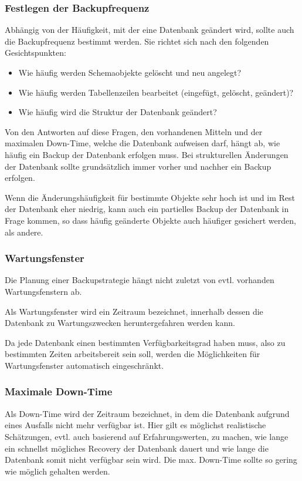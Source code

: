         \subsubsection{Festlegen der Backupfrequenz}
          Abh\"angig von der H\"aufigkeit, mit der eine Datenbank ge\"andert wird, sollte auch die Backupfrequenz bestimmt werden. Sie richtet sich nach den folgenden Gesichtspunkten:
          \begin{itemize}
            \item Wie h\"aufig werden Schemaobjekte gel\"oscht und neu angelegt?
            \item Wie h\"aufig werden Tabellenzeilen bearbeitet (eingef\"ugt, gel\"oscht, ge\"andert)?
            \item Wie h\"aufig wird die Struktur der Datenbank ge\"andert?
          \end{itemize}
          Von den Antworten auf diese Fragen, den vorhandenen Mitteln und der maximalen Down-Time, welche die Datenbank aufweisen darf, h\"angt ab, wie h\"aufig ein Backup der Datenbank erfolgen muss. Bei strukturellen \"Anderungen der Datenbank sollte grunds\"atzlich immer vorher und nachher ein Backup erfolgen.

          Wenn die \"Anderungsh\"aufigkeit f\"ur bestimmte Objekte sehr hoch ist und im Rest der Datenbank eher niedrig, kann auch ein partielles Backup der Datenbank in Frage kommen, so dass h\"aufig ge\"anderte Objekte auch h\"aufiger gesichert werden, als andere.
        \subsubsection{Wartungsfenster}
          Die Planung einer Backupstrategie h\"angt nicht zuletzt von evtl. vorhanden Wartungsfenstern ab.
          \begin{merke}
            Als Wartungsfenster wird ein Zeitraum bezeichnet, innerhalb dessen die Datenbank zu Wartungszwecken heruntergefahren werden kann.
          \end{merke}
          Da jede Datenbank einen bestimmten Verf\"ugbarkeitsgrad haben muss, also zu bestimmten Zeiten arbeitsbereit sein soll, werden die M\"oglichkeiten f\"ur Wartungsfenster automatisch eingeschr\"ankt.
        \subsubsection{Maximale Down-Time}
          \begin{merke}
            Als Down-Time wird der Zeitraum bezeichnet, in dem die Datenbank aufgrund eines Ausfalls nicht mehr verf\"ugbar ist. Hier gilt es m\"oglichst realistische Sch\"atzungen, evtl. auch basierend auf Erfahrungswerten, zu machen, wie lange ein schnellst m\"ogliches Recovery der Datenbank dauert und wie lange die Datenbank somit nicht verf\"ugbar sein wird. Die max. Down-Time sollte so gering wie m\"oglich gehalten werden.
          \end{merke}

